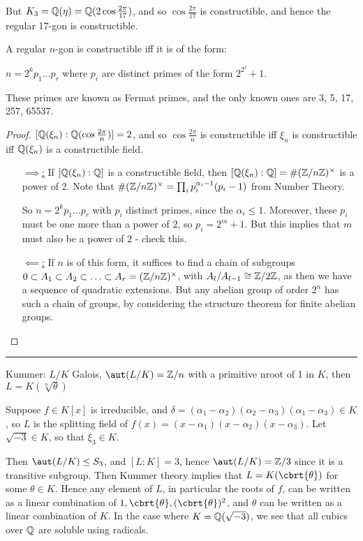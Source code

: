\documentclass[a4paper, 10pt, twocolumn]{amsart}
\begin{document}
\begin{enumerate}
\begin{enumerate}
But $K_3 = \mathbb{Q}(\eta) = \mathbb{Q}(2\cos \frac{2\pi}{17})$, and so $\cos \frac{2\pi}{17}$ is constructible, and hence the regular 17-gon is constructible.
\begin{theorem}[Gauss]
A regular $n$-gon is constructible iff it is of the form:
\begin{center}
$n = 2^k p_1\ldots p_r$ where $p_i$ are distinct primes of the form $2^{2^\ell} + 1$.
\end{center}
These primes are known as Fermat primes, and the only known ones are 3, 5, 17, 257, 65537.
\end{theorem}
\begin{proof}
$[\mathbb{Q}(\xi_n):\mathbb{Q}(\cos\frac{2\pi}{n})] = 2$, and so $\cos \frac{2\pi}{n}$ is constructible iff $\xi_n$ is constructible iff $\mathbb{Q}(\xi_n)$ is a constructible field.
\begin{itemize}
\item[\underline{$\implies$:}] If $[\mathbb{Q}(\xi_n):\mathbb{Q}]$ is a constructible field, then $[\mathbb{Q}(\xi_n):\mathbb{Q}] = \#(\mathbb{Z}/n\mathbb{Z})^{\times}$ is a power of 2. Note that $\#(\mathbb{Z}/n\mathbb{Z})^{\times} = \prod_i p_i^{\alpha_i-1}(p_i-1)$ from Number Theory.

So $n = 2^k p_1\ldots p_r$ with $p_i$ distinct primes, since the $\alpha_i \leq 1$. Moreover, these $p_i$ must be one more than a power of $2$, so $p_i = 2^m + 1$. But this implies that $m$ must also be a power of $2$ - check this.

\item[\underline{$\impliedby$:}] If $n$ is of this form, it suffices to find a chain of subgroups $0 \subset A_1 \subset A_2 \subset \ldots \subset A_r = (\mathbb{Z}/n\mathbb{Z})^{\times}$, with $A_l/A_{l-1} \cong \mathbb{Z}/2\mathbb{Z}$, as then we have a sequence of quadratic extensions. But any abelian group of order $2^n$ has such a chain of groups, by considering the structure theorem for finite abelian groups.
\end{itemize}
\end{proof}
\end{enumerate}
\end{enumerate}
\hrule
Kummer: $L/K$ Galois, $\aut(L/K) = \Z/n$ with a primitive n\th root of 1 in $K$, then $L = K(\sqrt[n]{\theta})$

Suppose $f \in K[x]$ is irreducible, and $\delta = (\alpha_1-\alpha_2)(\alpha_2-\alpha_3)(\alpha_1-\alpha_3) \in K$, so $L$ is the splitting field of $f(x) = (x-\alpha_1)(x-\alpha_2)(x-\alpha_3)$. Let $\sqrt{-3} \in K$, so that $\xi_3 \in K$.

Then $\aut(L/K) \leq S_3$, and $[L:K] = 3$, hence $\aut(L/K) = \Z/3$ since it is a transitive subgroup. Then Kummer theory implies that $L = K(\cbrt{\theta})$ for some $\theta \in K$. Hence any element of $L$, in particular the roots of $f$, can be written as a linear combination of $1, \cbrt{\theta}, (\cbrt{\theta})^2$, and $\theta$ can be written as a linear combination of $K$. In the case where $K = \mathbb{Q}(\sqrt{-3})$, we see that all cubics over $\mathbb{Q}$ are soluble using radicals.
\end{document}
